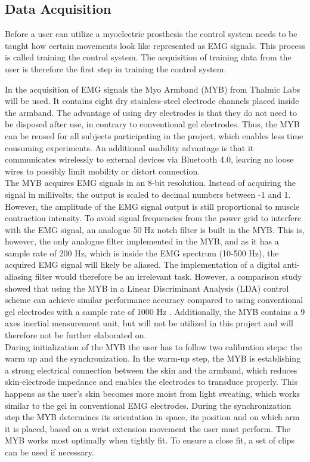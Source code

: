 \subsection{Data Acquisition} \label{sec:MYO}
Before a user can utilize a myoelectric prosthesis the control system needs to be taught how certain movements look like represented as EMG signals. This process is called training the control system. The acquisition of training data from the user is therefore the first step in training the control system.

In the acquisition of EMG signals the Myo Armband (MYB) from Thalmic Labs will be used. It contains eight dry stainless-steel electrode channels placed inside the armband. The advantage of using dry electrodes is that they do not need to be disposed after use, in contrary to conventional gel electrodes. Thus, the MYB can be reused for all subjects participating in the project, which enables less time consuming experiments. An additional usability advantage is that it communicates wirelessly to external devices via Bluetooth 4.0, leaving no loose wires to possibly limit mobility or distort connection. \cite{Myoarmband2013} \\ 
The MYB acquires EMG signals in an 8-bit resolution. Instead of acquiring the signal in millivolts, the output is scaled to decimal numbers between -1 and 1. However, the amplitude of the EMG signal output is still proportional to muscle contraction intensity. To avoid signal frequencies from the power grid to interfere with the EMG signal, an analogue 50 Hz notch filter is built in the MYB. This is, however, the only analogue filter implemented in the MYB, and as it has a sample rate of 200 Hz, which is inside the EMG spectrum (10-500 Hz), the acquired EMG signal will likely be aliased. The implementation of a digital anti-aliasing filter would therefore be an irrelevant task. However, a comparison study showed that using the MYB in a Linear Discriminant Analysis (LDA) control scheme can achieve similar performance accuracy compared to using conventional gel electrodes with a sample rate of 1000 Hz \cite{Mendez2017}. Additionally, the MYB contains a 9 axes inertial measurement unit, but will not be utilized in this project and will therefore not be further elaborated on. \cite{Myoarmband2013} \\
During initialization of the MYB the user has to follow two calibration steps: the warm up and the synchronization. In the warm-up step, the MYB is establishing a strong electrical connection between the skin and the armband, which reduces skin-electrode impedance and enables the electrodes to transduce properly. This happens as the user's skin becomes more moist from light sweating, which works similar to the gel in conventional EMG electrodes. During the synchronization step the MYB determines its orientation in space, its position and on which arm it is placed, based on a wrist extension movement the user must perform. 
The MYB works most optimally when tightly fit. To ensure a close fit, a set of clips can be used if necessary. \cite{Myoarmband2013}

